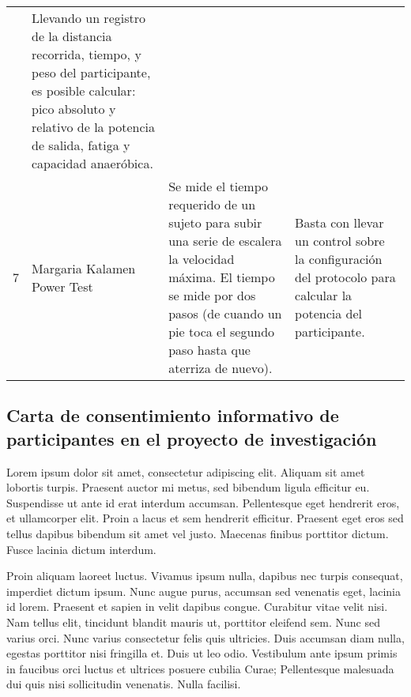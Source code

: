 \begin{table}
{\begin{tabular}{m{0.2cm}m{4cm}m{7cm}m{9cm}}
		& 	Llevando un registro de la distancia recorrida, tiempo, y peso del participante, es posible calcular: pico absoluto y relativo de la potencia de salida, fatiga y capacidad anaeróbica.\\
7	&	Margaria Kalamen Power Test
		&	Se mide el tiempo requerido de un sujeto para subir una serie de escalera la velocidad máxima. El tiempo se mide por dos pasos (de cuando un pie toca el segundo paso hasta que aterriza de nuevo).
		& 	Basta con llevar un control sobre la configuración del protocolo para calcular la potencia del participante.\\		
\hline
\end{tabular}
}
\end{table}

\pagebreak
\subsection{Carta de consentimiento informativo de participantes en el proyecto de investigación}\label{aped:A_cartaConsentiemiento}
Lorem ipsum dolor sit amet, consectetur adipiscing elit. Aliquam sit amet lobortis turpis. Praesent auctor mi metus, sed bibendum ligula efficitur eu. Suspendisse ut ante id erat interdum accumsan. Pellentesque eget hendrerit eros, et ullamcorper elit. Proin a lacus et sem hendrerit efficitur. Praesent eget eros sed tellus dapibus bibendum sit amet vel justo. Maecenas finibus porttitor dictum. Fusce lacinia dictum interdum.

Proin aliquam laoreet luctus. Vivamus ipsum nulla, dapibus nec turpis consequat, imperdiet dictum ipsum. Nunc augue purus, accumsan sed venenatis eget, lacinia id lorem. Praesent et sapien in velit dapibus congue. Curabitur vitae velit nisi. Nam tellus elit, tincidunt blandit mauris ut, porttitor eleifend sem. Nunc sed varius orci. Nunc varius consectetur felis quis ultricies. Duis accumsan diam nulla, egestas porttitor nisi fringilla et. Duis ut leo odio. Vestibulum ante ipsum primis in faucibus orci luctus et ultrices posuere cubilia Curae; Pellentesque malesuada dui quis nisi sollicitudin venenatis. Nulla facilisi. 


